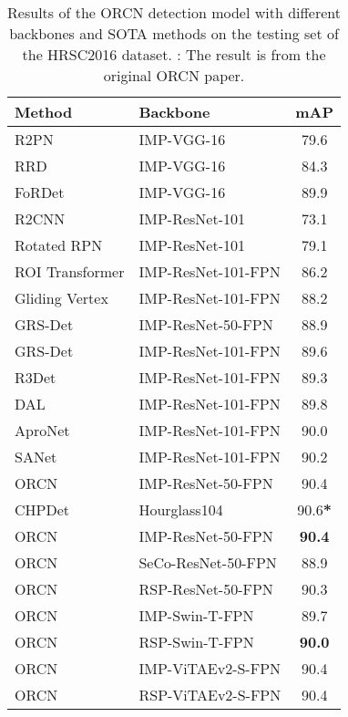 \documentclass[10pt, journal,twoside]{IEEEtran}
\begin{document}
\begin{table}[h]
  \scriptsize
  \caption{Results of the ORCN detection model with different backbones and SOTA methods on the testing set of the HRSC2016 dataset. : The result is from the original ORCN paper.}
  \newcommand{\tabincell}[2]{\begin{tabular}{@{}#1@{}}#2\end{tabular}}
  \centering
  \begin{tabular}{l|l|c}
  \hline
  Method & Backbone & mAP \\
  \hline
  R2PN \cite{aod_2018_grsl_r2pn} & IMP-VGG-16 & 79.6 \\
  RRD \cite{rrd} & IMP-VGG-16 & 84.3 \\
  FoRDet \cite{aod_2022_tgrs_fordet} & IMP-VGG-16 & 89.9\\
  R2CNN \cite{r2cnn} & IMP-ResNet-101 & 73.1 \\
  Rotated RPN \cite{aod_2018_tmm_rotated_rpn} & IMP-ResNet-101 & 79.1  \\
  ROI Transformer \cite{roi_transformer} & IMP-ResNet-101-FPN & 86.2  \\
  Gliding Vertex \cite{glid_vertex} & IMP-ResNet-101-FPN & 88.2 \\
  GRS-Det \cite{aod_2021_tgrs_grsdet} & IMP-ResNet-50-FPN & 88.9 \\
  GRS-Det \cite{aod_2021_tgrs_grsdet} & IMP-ResNet-101-FPN & 89.6\\
  R3Det \cite{r3det} & IMP-ResNet-101-FPN & 89.3  \\
  DAL \cite{dal} & IMP-ResNet-101-FPN & 89.8 \\
  AproNet \cite{aod_2022_tgrs_s2anet} & IMP-ResNet-101-FPN & 90.0 \\
  SANet \cite{aod_2022_tgrs_s2anet} & IMP-ResNet-101-FPN & 90.2 \\
  ORCN  \cite{orcn} & IMP-ResNet-50-FPN & 90.4 \\
  CHPDet \cite{aod_2022_tgrs_chpdet} & Hourglass104 & 90.6\textbf{*} \\
  \hline
  ORCN & IMP-ResNet-50-FPN & \bfseries 90.4\\
  ORCN & SeCo-ResNet-50-FPN & 88.9 \\
  ORCN & RSP-ResNet-50-FPN & 90.3 \\
  \hline
  ORCN & IMP-Swin-T-FPN & 89.7 \\
  ORCN & RSP-Swin-T-FPN & \bfseries 90.0 \\
  \hline
  ORCN & IMP-ViTAEv2-S-FPN & 90.4 \\
  ORCN & RSP-ViTAEv2-S-FPN & 90.4 \\
  \hline
\end{tabular}
  \label{det_hrsc}
\end{table}
\end{document}
